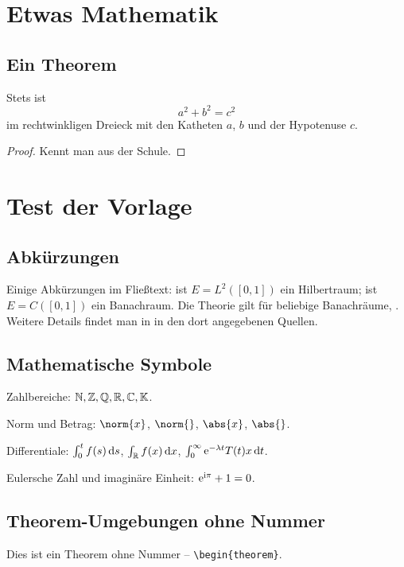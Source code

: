 \begin{refsection}
\section*{Etwas Mathematik}
\subsection*{Ein Theorem}
\begin{theorem}
Stets ist
\[
    a^{2} + b^{2} = c^{2}
\]
im rechtwinkligen Dreieck mit den Katheten $a$, $b$ und der Hypotenuse $c$.
\end{theorem}
\begin{proof}
Kennt man aus der Schule.
\end{proof}
\section*{Test der Vorlage}

\subsection*{Abkürzungen}

Einige Abkürzungen im Fließtext: \zB ist $E = L^2([0,1])$ ein
Hilbertraum; \bzw ist $E = C([0,1])$ ein Banachraum.
Die Theorie gilt \zB für beliebige Banachräume, \vgl \textcite{alsina:2013}.
Weitere Details findet man \ua in \textcite{takesaki:1958} \bzw in
den dort angegebenen Quellen.

\subsection*{Mathematische Symbole}

Zahlbereiche: $\mathbb{N}, \mathbb{Z}, \mathbb{Q}, \mathbb{R}, \mathbb{C}, \mathbb{K}$.

Norm und Betrag: $\norm{x}$, $\norm{}$, $\abs{x}$, $\abs{}$.

Differentiale: $\int_0^t f(s)\mathop{}\!\mathrm{d}{s}$, $\int_{\mathbb{R}} f(x)\mathop{}\!\mathrm{d}{x}$,
$\int_0^\infty \mathrm{e}^{-\lambda t} T(t)x\mathop{}\!\mathrm{d}{t}$.

Eulersche Zahl und imaginäre Einheit: $\mathrm{e}^{\mathrm{i}\pi} + 1 = 0$.

\subsection*{Theorem-Umgebungen ohne Nummer}

\begin{theorem}
Dies ist ein Theorem ohne Nummer -- \verb|\begin{theorem}|.
\end{theorem}


\end{refsection}
